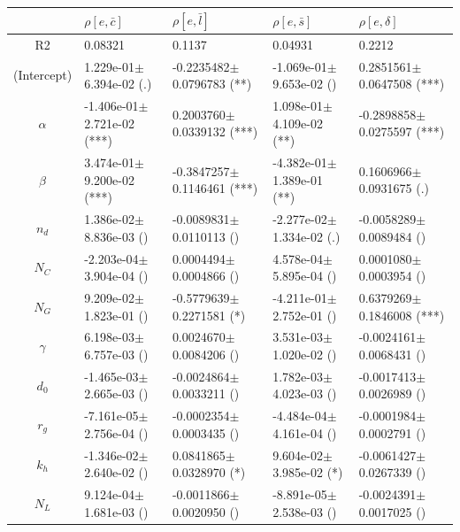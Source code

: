 \begin{center}
\begin{tabular}{|c|p{3.7cm}|p{3.7cm}|p{3.7cm}|p{3.7cm}|}
 \hline
&$\rho[e,\bar{c}]$&$\rho[e,\bar{l}]$&$\rho[e,\bar{s}]$&$\rho[e,\delta]$\\\hline
R2&0.08321&0.1137&0.04931&0.2212\\\hline
(Intercept)&1.229e-01$\pm$6.394e-02 (.)&-0.2235482$\pm$0.0796783 (**)&-1.069e-01$\pm$9.653e-02 ()&0.2851561$\pm$0.0647508 (***)\\
$\alpha$&-1.406e-01$\pm$2.721e-02 (***)&0.2003760$\pm$0.0339132 (***)&1.098e-01$\pm$4.109e-02 (**)&-0.2898858$\pm$0.0275597 (***)\\
$\beta$&3.474e-01$\pm$9.200e-02 (***)&-0.3847257$\pm$0.1146461 (***)&-4.382e-01$\pm$1.389e-01 (**)&0.1606966$\pm$0.0931675 (.)\\
$n_d$&1.386e-02$\pm$8.836e-03 ()&-0.0089831$\pm$0.0110113 ()&-2.277e-02$\pm$1.334e-02 (.)&-0.0058289$\pm$0.0089484 ()\\
$N_C$&-2.203e-04$\pm$3.904e-04 ()&0.0004494$\pm$0.0004866 ()&4.578e-04$\pm$5.895e-04 ()&0.0001080$\pm$0.0003954 ()\\
$N_G$&9.209e-02$\pm$1.823e-01 ()&-0.5779639$\pm$0.2271581 (*)&-4.211e-01$\pm$2.752e-01 ()&0.6379269$\pm$0.1846008 (***)\\
$\gamma$&6.198e-03$\pm$6.757e-03 ()&0.0024670$\pm$0.0084206 ()&3.531e-03$\pm$1.020e-02 ()&-0.0024161$\pm$0.0068431 ()\\
$d_0$&-1.465e-03$\pm$2.665e-03 ()&-0.0024864$\pm$0.0033211 ()&1.782e-03$\pm$4.023e-03 ()&-0.0017413$\pm$0.0026989 ()\\
$r_g$&-7.161e-05$\pm$2.756e-04 ()&-0.0002354$\pm$0.0003435 ()&-4.484e-04$\pm$4.161e-04 ()&-0.0001984$\pm$0.0002791 ()\\
$k_h$&-1.346e-02$\pm$2.640e-02 ()&0.0841865$\pm$0.0328970 (*)&9.604e-02$\pm$3.985e-02 (*)&-0.0061427$\pm$0.0267339 ()\\
$N_L$&9.124e-04$\pm$1.681e-03 ()&-0.0011866$\pm$0.0020950 ()&-8.891e-05$\pm$2.538e-03 ()&-0.0024391$\pm$0.0017025 ()\\
\hline
\end{tabular}

\bigskip


\end{center}
